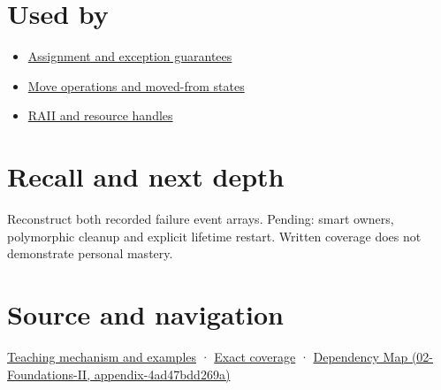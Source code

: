 \section{Used by}\label{appendix-9bfe377cef7a-used-by}

\begin{itemize}
\tightlist
\item
  \hyperref[appendix-bea6beb5350f]{Assignment and exception guarantees}
\item
  \hyperref[appendix-5636651017c2]{Move operations and moved-from states}
\item
  \hyperref[appendix-69739d3ab49b]{RAII and resource handles}
\end{itemize}

\section{Recall and next depth}\label{appendix-9bfe377cef7a-recall-and-next-depth}

Reconstruct both recorded failure event arrays. Pending: smart owners, polymorphic cleanup and explicit lifetime restart. Written coverage does not demonstrate personal mastery.

\section{Source and navigation}\label{appendix-9bfe377cef7a-source-and-navigation}

\href{Continuous\%20Notes/Computing\%20Foundations\%20-\%20From\%20Bits\%20to\%20C++\%20and\%20Systems\%20APIs\#Destruction\%20closes\%20the\%20ownership\%20interval}{Teaching mechanism and examples} · \hyperref[appendix-fd090d982a15-m009---parts-127-147]{Exact coverage} · \href{../02-Foundations-II/main.pdf\#nameddest=appendix-4ad47bdd269a}{Dependency Map (02-Foundations-II, appendix-4ad47bdd269a)}
